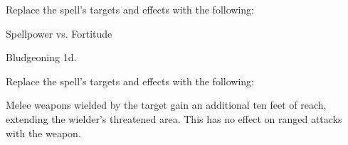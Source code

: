 Replace the spell's targets and effects with the following:
\begin{spellcontent}

\begin{augmenttargetinginfo}



\end{augmenttargetinginfo}


\begin{augmenteffects}




\begin{spellattack}{Spellpower vs. Fortitude}


\hit Bludgeoning  \minus1d.


\end{spellattack}





\end{augmenteffects}

\end{spellcontent}








Replace the spell's targets and effects with the following:
\begin{spellcontent}

\begin{augmenttargetinginfo}



\end{augmenttargetinginfo}


\begin{augmenteffects}



\spelleffect
Melee weapons wielded by the target gain an additional ten feet of reach, extending the wielder's threatened area.
This has no effect on ranged attacks with the weapon.








\end{augmenteffects}

\end{spellcontent}





